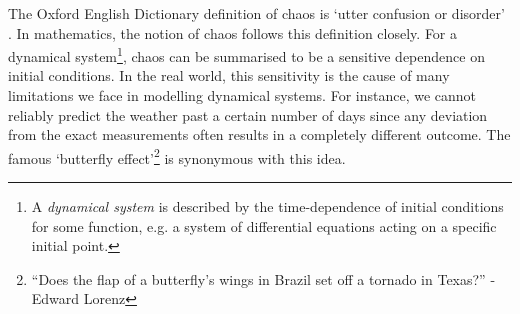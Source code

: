 The Oxford English Dictionary definition of chaos is `utter confusion or disorder' \cite{OED}. 
In mathematics, the notion of chaos follows this definition closely. 
For a dynamical system\footnote{A \emph{dynamical system} is described by the time-dependence of initial conditions for some function, e.g. a system of differential equations acting on a specific initial point.}, chaos can be summarised to be a sensitive dependence on initial conditions.
In the real world, this sensitivity is the cause of many limitations we face in modelling dynamical systems. For instance, we cannot reliably predict the weather past a certain number of days since any deviation from the exact measurements often results in a completely different outcome. The famous `butterfly effect'\footnote{“Does the flap of a butterfly's wings in Brazil set off a tornado in Texas?” - Edward Lorenz} is synonymous with this idea.

